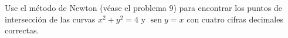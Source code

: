 \item Use el método de Newton (véase el problema 9) para encontrar los puntos de intersección de las curvas $x^2 + y^2 = 4$ y $\operatorname{sen} y = x$ con cuatro cifras decimales correctas.

